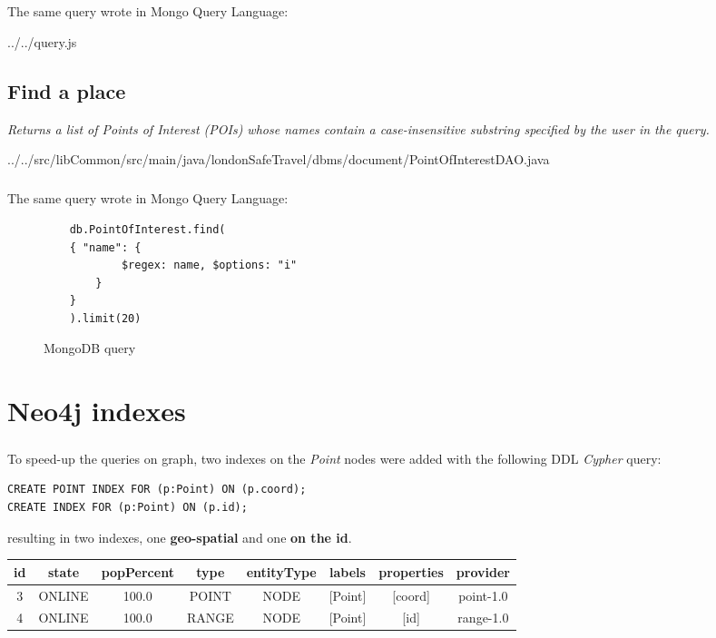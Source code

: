 \paragraph{}
The same query wrote in Mongo Query Language:

{../../query.js}


\section{Find a place}
\textit{Returns a list of Points of Interest (POIs) whose names contain a case-insensitive substring specified by the user in the query.}


{../../src/libCommon/src/main/java/londonSafeTravel/dbms/document/PointOfInterestDAO.java}
\paragraph{}
The same query wrote in Mongo Query Language:
\begin{figure}[H]
	\begin{lstlisting}
	db.PointOfInterest.find(
	{ "name": { 
			$regex: name, $options: "i" 
		} 
	}
	).limit(20)
	\end{lstlisting}
	\caption{MongoDB query}
\end{figure}


\chapter{Neo4j indexes}

\paragraph{}
To speed-up the queries on graph, two indexes on the \textit{Point} nodes were added with the following DDL \textit{Cypher} query:

\begin{lstlisting}
CREATE POINT INDEX FOR (p:Point) ON (p.coord);
CREATE INDEX FOR (p:Point) ON (p.id);
\end{lstlisting}

resulting in two indexes, one \textbf{geo-spatial} and one \textbf{on the id}.

\begin{tabular}{|c|c|c|c|c|c|c|c|}
	\hline
	
	id & state & popPercent & type & entityType & labels & properties & provider \\
	
	\hline
	\hline
	
	3 & ONLINE & 100.0 & POINT & NODE & [Point] & [coord] & point-1.0 \\
	
	\hline
	
	4 & ONLINE & 100.0 & RANGE & NODE & [Point] & [id] & range-1.0 \\
	
	\hline
\end{tabular}

